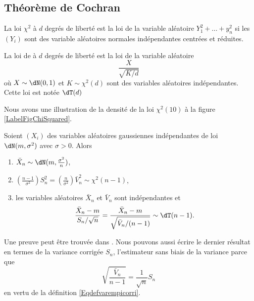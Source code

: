 \subsection{Théorème de Cochran}

\begin{definition}
    La loi \( \chi^2\) à \( d\) degrés de liberté est la loi de la variable aléatoire \( Y_1^2+\ldots+y_n^2\) si les \( (Y_i)\) sont des variable aléatoires normales indépendantes centrées et réduites.

    La loi de  à \( d\) degrés de liberté est la loi de la variable aléatoire
    \begin{equation}
        \frac{ X }{ \sqrt{K/d} }
    \end{equation}
    où \( X\sim\dN(0,1)\) et \( K\sim\chi^2(d)\) sont des variables aléatoires indépendantes. Cette loi est notée \( \dT(d)\)
\end{definition}

Nous avons une illustration de la densité de la loi \( \chi^2(10)\) à la figure \ref{LabelFigChiSquared}.
\newcommand{\CaptionFigChiSquared}{La densité de $\chi^2(10)$.}




\begin{theorem}     \label{ThoCochraneChiStudent}
    Soient \( (X_i)\) des variables aléatoires gaussiennes indépendantes de loi \( \dN(m,\sigma^2)\) avec \( \sigma>0\). Alors
    \begin{enumerate}
        \item
            \( \bar X_n\sim\dN(m,\frac{ \sigma^2 }{ n })\),
        \item       \label{ItemThoCochraneChiStudentii}
            \( \left( \frac{ n-1 }{ \sigma^2 } \right)S_n^2=\left( \frac{ n }{ \sigma^2 } \right)\bar V_n^2\sim\chi^2(n-1)\),
        \item
            les variables aléatoires \( \bar X_n\) et \( \bar V_n\) sont indépendantes et
            \begin{equation}
                \frac{ \bar X_n-m }{ S_n/\sqrt{n} }=\frac{ \bar X_n-m }{ \sqrt{\bar V_n/(n-1)} }\sim\dT(n-1).
            \end{equation}
    \end{enumerate}
\end{theorem}
Une preuve peut être trouvée dans \cite{ProbaDanielLi}. Nous pouvons aussi écrire le dernier résultat en termes de la variance corrigée \( S_n\), l'estimateur sans biais de la variance parce que
\begin{equation}
    \sqrt{\frac{ \bar V_n }{ n-1 }}=\frac{1}{ \sqrt{n} }S_n
\end{equation}
en vertu de la définition \eqref{Eqdefvarempicorri}.

